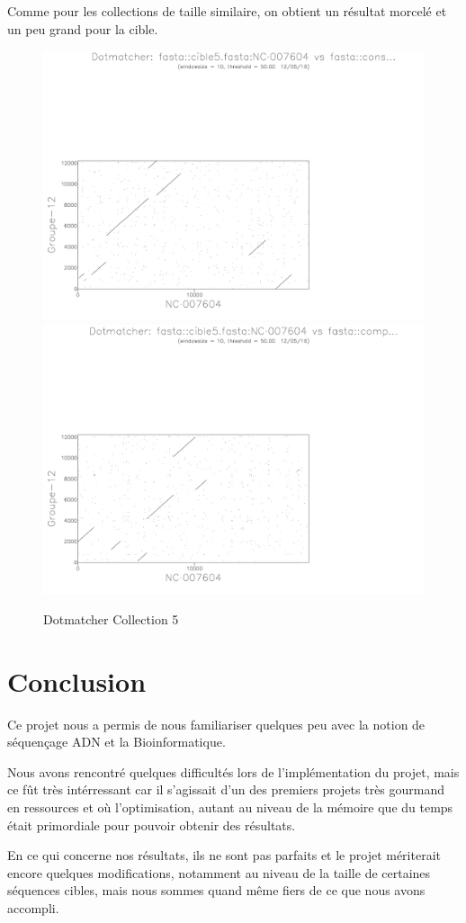 \documentclass[a4paper]{article}
\begin{document}
Comme pour les collections de taille similaire, on obtient un résultat
morcelé et un peu grand pour la cible.

\begin{figure}[H]
\includegraphics[scale=0.25]{5}\includegraphics[scale=0.25]{5compl}\caption{Dotmatcher Collection 5}
\end{figure}

\section{Conclusion}
Ce projet nous a permis de nous familiariser quelques peu avec la notion de séquençage ADN et la Bioinformatique.

Nous avons rencontré quelques difficultés lors de l'implémentation du projet, mais ce fût très intérressant car il s'agissait d'un des premiers projets très gourmand en ressources et où l'optimisation, autant au niveau de la mémoire que du temps était primordiale pour pouvoir obtenir des résultats.

En ce qui concerne nos résultats, ils ne sont pas parfaits et le projet mériterait encore quelques modifications, notamment au niveau de la taille de certaines séquences cibles, mais nous sommes quand même fiers de ce que nous avons accompli.
\end{document}
